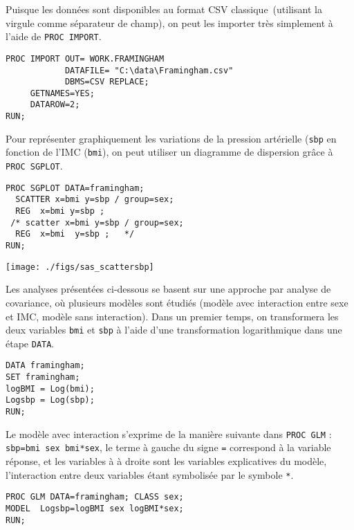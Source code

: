 \soln{\ref{exo:10.3}}
Puisque les données sont disponibles au format CSV \og classique\fg\
(utilisant la virgule comme séparateur de champ), on peut les importer très
simplement à l'aide de \texttt{PROC IMPORT}.
\begin{verbatim}
PROC IMPORT OUT= WORK.FRAMINGHAM
            DATAFILE= "C:\data\Framingham.csv"
            DBMS=CSV REPLACE;
     GETNAMES=YES;
     DATAROW=2;
RUN;
\end{verbatim}


Pour représenter graphiquement les variations de la pression artérielle
(\texttt{sbp} en fonction de l'IMC (\texttt{bmi}), on peut utiliser un
diagramme de dispersion grâce à \texttt{PROC SGPLOT}.
\begin{verbatim}
PROC SGPLOT DATA=framingham;
  SCATTER x=bmi y=sbp / group=sex;
  REG  x=bmi y=sbp ;
 /* scatter x=bmi y=sbp / group=sex;
  REG  x=bmi  y=sbp ;   */
RUN;
\end{verbatim}

\texttt{[image: ./figs/sas\_scattersbp]}

Les analyses présentées ci-dessous se basent sur une approche par analyse de
covariance, où plusieurs modèles sont étudiés (modèle avec interaction entre
sexe et IMC, modèle sans interaction).
Dans un premier temps, on transformera les deux variables \texttt{bmi} et
\texttt{sbp} à l'aide d'une transformation logarithmique dans une étape
\texttt{DATA}.
\begin{verbatim}
DATA framingham;
SET framingham;
logBMI = Log(bmi);
Logsbp = Log(sbp);
RUN;
\end{verbatim}

Le modèle avec interaction s'exprime de la manière suivante dans
\texttt{PROC GLM} : \verb|sbp=bmi sex bmi*sex|, le terme à gauche du signe
\texttt{=} correspond à la variable réponse, et les variables à à droite
sont les variables explicatives du modèle, l'interaction entre deux
variables étant symbolisée par le symbole \texttt{*}.
\begin{verbatim}
PROC GLM DATA=framingham; CLASS sex;
MODEL  Logsbp=logBMI sex logBMI*sex;
RUN;
\end{verbatim}

